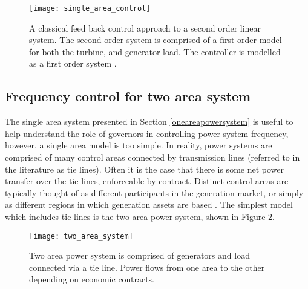 \begin{figure}[ht]
\centering
\texttt{[image: single\_area\_control]}
\caption{A classical feed back control approach to a second order linear system. The second order system is comprised of a first order model for both the turbine, and generator load. The controller is modelled as a first order system \cite{Kothari2011}.}
\label{fig:singleareacontrol}
\end{figure}


\subsection{Frequency control for two area system}
The single area system presented in Section \ref{oneareapowersystem} is useful to help understand the role of governors in controlling power system frequency, however, a single area model is too simple. In reality, power systems are comprised of many control areas connected by transmission lines (referred to in the literature as tie lines). Often it is the case that there is some net power transfer over the tie lines, enforceable by contract. Distinct control areas are typically thought of as different participants in the generation market, or simply as different regions in which generation assets are based \cite{Kothari2011}. The simplest model which includes tie lines is the two area power system, shown in Figure \ref{fig:twoareapower}.

\begin{figure}[ht]
	\centering
	\texttt{[image: two\_area\_system]}
	\caption{Two area power system is comprised of generators and load connected via a tie line. Power flows from one area to the other depending on economic contracts.}
	\label{fig:twoareapower}
\end{figure}

